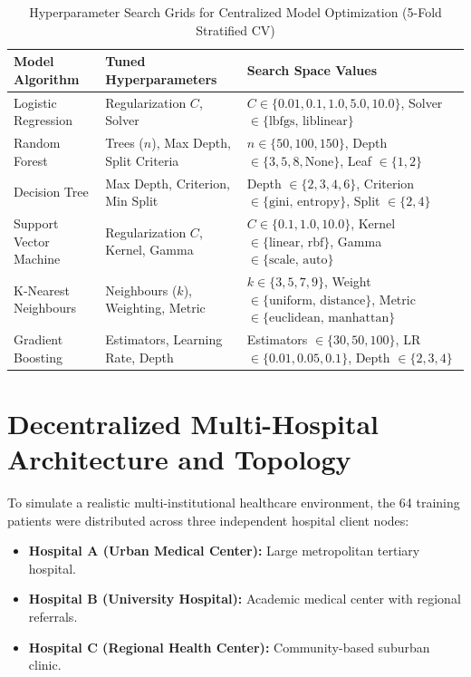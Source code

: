 \begin{table}[htbp]
\centering
\caption{Hyperparameter Search Grids for Centralized Model Optimization (5-Fold Stratified CV)}
\label{tab:hyperparam_grids}
\begin{tabular}{@{}llp{6.5cm}@{}}
\toprule
\textbf{Model Algorithm} & \textbf{Tuned Hyperparameters} & \textbf{Search Space Values} \\ \midrule
Logistic Regression & Regularization $C$, Solver & $C \in \{0.01, 0.1, 1.0, 5.0, 10.0\}$, Solver $\in \{\text{lbfgs, liblinear}\}$ \\
Random Forest & Trees ($n$), Max Depth, Split Criteria & $n \in \{50, 100, 150\}$, Depth $\in \{3, 5, 8, \text{None}\}$, Leaf $\in \{1, 2\}$ \\
Decision Tree & Max Depth, Criterion, Min Split & Depth $\in \{2, 3, 4, 6\}$, Criterion $\in \{\text{gini, entropy}\}$, Split $\in \{2, 4\}$ \\
Support Vector Machine & Regularization $C$, Kernel, Gamma & $C \in \{0.1, 1.0, 10.0\}$, Kernel $\in \{\text{linear, rbf}\}$, Gamma $\in \{\text{scale, auto}\}$ \\
K-Nearest Neighbours & Neighbours ($k$), Weighting, Metric & $k \in \{3, 5, 7, 9\}$, Weight $\in \{\text{uniform, distance}\}$, Metric $\in \{\text{euclidean, manhattan}\}$ \\
Gradient Boosting & Estimators, Learning Rate, Depth & Estimators $\in \{30, 50, 100\}$, LR $\in \{0.01, 0.05, 0.1\}$, Depth $\in \{2, 3, 4\}$ \\ \bottomrule
\end{tabular}
\end{table}

\section{Decentralized Multi-Hospital Architecture and Topology}
\label{sec:decentralized_topology}

To simulate a realistic multi-institutional healthcare environment, the 64 training patients were distributed across three independent hospital client nodes:
\begin{itemize}
    \item \textbf{Hospital A (Urban Medical Center):} Large metropolitan tertiary hospital.
    \item \textbf{Hospital B (University Hospital):} Academic medical center with regional referrals.
    \item \textbf{Hospital C (Regional Health Center):} Community-based suburban clinic.
\end{itemize}

